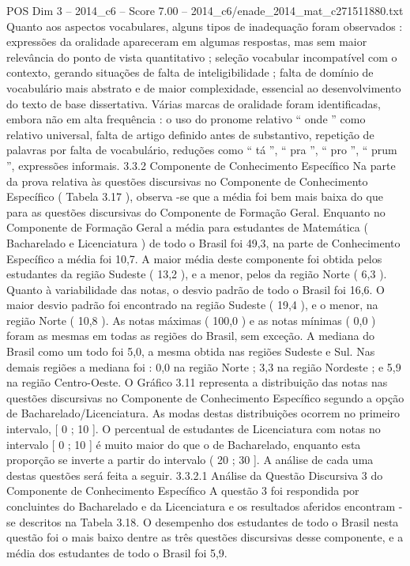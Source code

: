 \begin{textsample}{POS Dim 3 – 2014\_c6 – Score 7.00 – 2014\_c6/enade\_2014\_mat\_c271511880.txt}
Quanto aos aspectos vocabulares, alguns tipos de inadequação foram observados : expressões da oralidade apareceram em algumas respostas, mas sem maior relevância do ponto de vista quantitativo ; seleção vocabular incompatível com o contexto, gerando situações de falta de inteligibilidade ; falta de domínio de vocabulário mais abstrato e de maior complexidade, essencial ao desenvolvimento do texto de base dissertativa.
Várias marcas de oralidade foram identificadas, embora não em alta frequência : o uso do pronome relativo “ onde ” como relativo universal, falta de artigo definido antes de substantivo, repetição de palavras por falta de vocabulário, reduções como “ tá ”, “ pra ”, “ pro ”, “ prum ”, expressões informais. 3.3.2 Componente de Conhecimento Específico Na parte da prova relativa às questões discursivas no Componente de Conhecimento Específico ( Tabela 3.17 ), observa -se que a média foi bem mais baixa do que para as questões discursivas do Componente de Formação Geral.
Enquanto no Componente de Formação Geral a média para estudantes de Matemática ( Bacharelado e Licenciatura ) de todo o Brasil foi 49,3, na parte de Conhecimento Específico a média foi 10,7.
A maior média deste componente foi obtida pelos estudantes da região Sudeste ( 13,2 ), e a menor, pelos da região Norte ( 6,3 ).
Quanto à variabilidade das notas, o desvio padrão de todo o Brasil foi 16,6.
O maior desvio padrão foi encontrado na região Sudeste ( 19,4 ), e o menor, na região Norte ( 10,8 ).
As notas máximas ( 100,0 ) e as notas mínimas ( 0,0 ) foram as mesmas em todas as regiões do Brasil, sem exceção.
A mediana do Brasil como um todo foi 5,0, a mesma obtida nas regiões Sudeste e Sul.
Nas demais regiões a mediana foi : 0,0 na região Norte ; 3,3 na região Nordeste ; e 5,9 na região Centro-Oeste.
O Gráfico 3.11 representa a distribuição das notas nas questões discursivas no Componente de Conhecimento Específico segundo a opção de Bacharelado/Licenciatura.
As modas destas distribuições ocorrem no primeiro intervalo, [ 0 ; 10 ].
O percentual de estudantes de Licenciatura com notas no intervalo [ 0 ; 10 ] é muito maior do que o de Bacharelado, enquanto esta proporção se inverte a partir do intervalo ( 20 ; 30 ].
A análise de cada uma destas questões será feita a seguir. 3.3.2.1 Análise da Questão Discursiva 3 do Componente de Conhecimento Específico A questão 3 foi respondida por concluintes do Bacharelado e da Licenciatura e os resultados aferidos encontram -se descritos na Tabela 3.18.
O desempenho dos estudantes de todo o Brasil nesta questão foi o mais baixo dentre as três questões discursivas desse componente, e a média dos estudantes de todo o Brasil foi 5,9.

\end{textsample}
